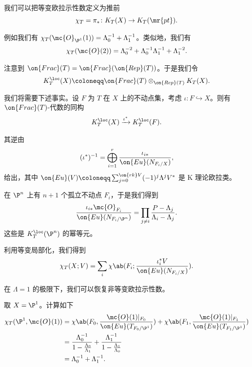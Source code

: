 \begin{defn}
    我们可以把等变欧拉示性数定义为推前
    \[ \chi_T = \pi_* \colon K_T(X) \to K_T(\mr{pt}). \]
\end{defn}

\begin{exm}
    例如我们有 \(\chi_T(\mc{O}_{\P^1}(1)) = \Lambda_0^{-1} + \Lambda_1^{-1}\)。类似地，我们有
    \[ \chi_T(\mc{O}(2)) = \Lambda_0^{-2} + \Lambda_0^{-1} \Lambda_1^{-1} + \Lambda_1^{-2}. \]
\end{exm}

\begin{notn}
    注意到 \(\on{Frac}(T) = \on{Frac}(\on{Rep}(T))\)。于是我们令
    \[ K_T^{\loc}(X) \coloneqq \on{Frac}(T) \otimes_{\on{Rep}(T)} K_T(X). \]
\end{notn}

我们将需要下述事实。设 \(F\) 为 \(T\) 在 \(X\) 上的不动点集，考虑 \(\iota \colon F \hookrightarrow X\)。则有 \(\on{Frac}(T)\)-代数的同构
\[ K_T^{\loc}(X) \xrightarrow{\iota^*} K_T^{\loc}(F). \]

\begin{rmk}
    其逆由
    \[ (\iota^*)^{-1} = \bigoplus_{i=1}^r \frac{\iota_{i*}}{\on{Eu}(N_{F_i/X})}, \]
    给出，其中 \(\on{Eu}(V) \coloneqq \sum_{j = 0}^{\on{rk} V} (-1)^j \Lambda^j V^*\) 是 K 理论欧拉类。
\end{rmk}

\begin{exm}
    在 \(\P^n\) 上有 \(n+1\) 个孤立不动点 \(F_i\)，于是我们得到
    \[ \frac{\iota_{i*} \mc{O}_{F_i}}{\on{Eu}(N_{F_i/\P^n})} = \prod_{j \neq i} \frac{P - \Lambda_j}{\Lambda_i - \Lambda_j}. \]
    这些是 \(K_T^{\loc}(\P^n)\) 的幂等元。
\end{exm}

利用等变局部化，我们得到
\[ \chi_T(X; V) = \sum_i \chi\ab(F_i; \frac{\iota_i^* V}{\on{Eu}(N_{F_i/X})}). \]

\begin{rmk}
    在 \(\Lambda = 1\) 的极限下，我们可以恢复非等变欧拉示性数。
\end{rmk}

\begin{exm}
    取 \(X = \P^1\)。计算如下
    \begin{align*}
        \chi_T(\P^1, \mc{O}(1)) &= \chi\ab(F_0, \frac{\mc{O}(1)|_{F_0}}{\on{Eu}(T_{F_0/\P^1})}) + \chi\ab(F_1, \frac{\mc{O}(1)|_{F_1}}{\on{Eu}(T_{F_1/\P^1})}) \\
        &= \frac{\Lambda_0^{-1}}{1 - \frac{\Lambda_0}{\Lambda_1}} + \frac{\Lambda_1^{-1}}{1 - \frac{\Lambda_1}{\Lambda_0}} \\
        &= \Lambda_0^{-1} + \Lambda_1^{-1}. 
    \end{align*}
\end{exm}

